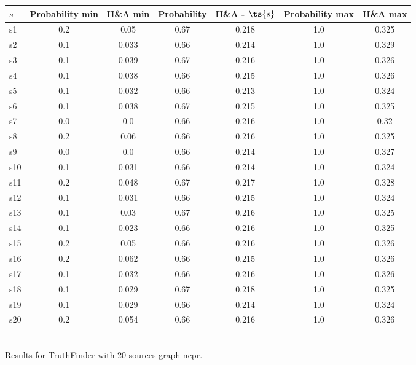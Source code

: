 \documentclass{article}
\begin{document}
\noindent\begin{tabular}{|l|c|c|c|c|c|c|}
\hline
$s$& Probability min & H\&A min & Probability & H\&A - $\ts{s}$ & Probability max & H\&A max\\
\hline
s1 &0.2 & 0.05 & 0.67 & 0.218 & 1.0 & 0.325\\
\hline
s2 &0.1 & 0.033 & 0.66 & 0.214 & 1.0 & 0.329\\
\hline
s3 &0.1 & 0.039 & 0.67 & 0.216 & 1.0 & 0.326\\
\hline
s4 &0.1 & 0.038 & 0.66 & 0.215 & 1.0 & 0.326\\
\hline
s5 &0.1 & 0.032 & 0.66 & 0.213 & 1.0 & 0.324\\
\hline
s6 &0.1 & 0.038 & 0.67 & 0.215 & 1.0 & 0.325\\
\hline
s7 &0.0 & 0.0 & 0.66 & 0.216 & 1.0 & 0.32\\
\hline
s8 &0.2 & 0.06 & 0.66 & 0.216 & 1.0 & 0.325\\
\hline
s9 &0.0 & 0.0 & 0.66 & 0.214 & 1.0 & 0.327\\
\hline
s10 &0.1 & 0.031 & 0.66 & 0.214 & 1.0 & 0.324\\
\hline
s11 &0.2 & 0.048 & 0.67 & 0.217 & 1.0 & 0.328\\
\hline
s12 &0.1 & 0.031 & 0.66 & 0.215 & 1.0 & 0.324\\
\hline
s13 &0.1 & 0.03 & 0.67 & 0.216 & 1.0 & 0.325\\
\hline
s14 &0.1 & 0.023 & 0.66 & 0.216 & 1.0 & 0.325\\
\hline
s15 &0.2 & 0.05 & 0.66 & 0.216 & 1.0 & 0.326\\
\hline
s16 &0.2 & 0.062 & 0.66 & 0.215 & 1.0 & 0.326\\
\hline
s17 &0.1 & 0.032 & 0.66 & 0.216 & 1.0 & 0.326\\
\hline
s18 &0.1 & 0.029 & 0.67 & 0.218 & 1.0 & 0.325\\
\hline
s19 &0.1 & 0.029 & 0.66 & 0.214 & 1.0 & 0.324\\
\hline
s20 &0.2 & 0.054 & 0.66 & 0.216 & 1.0 & 0.326\\
\hline
\end{tabular}\\

\noindent Results for TruthFinder with 20 sources graph ncpr.
\end{document}
